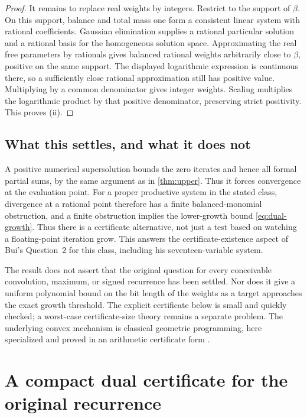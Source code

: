 \documentclass[11pt,a4paper]{article}
\theoremstyle{definition}
\theoremstyle{remark}
\begin{document}
\begin{proof}
It remains to replace real weights by integers. Restrict to the support of
$\beta$. On this support, balance and total mass one form a consistent
linear system with rational coefficients. Gaussian elimination supplies a
rational particular solution and a rational basis for the homogeneous
solution space. Approximating the real free parameters by rationals gives
balanced rational weights arbitrarily close to $\beta$, positive on the
same support. The displayed logarithmic expression is continuous there,
so a sufficiently close rational approximation still has positive value.
Multiplying by a common denominator gives integer weights. Scaling multiplies
the logarithmic product by that positive denominator, preserving strict
positivity. This proves (ii).
\end{proof}

\subsection{What this settles, and what it does not}
A positive numerical supersolution bounds the zero iterates and hence all
formal partial sums, by the same argument as in \cref{thm:upper}. Thus it
forces convergence at the evaluation point. For a proper productive system
in the stated class, divergence at a rational point therefore has a finite
balanced-monomial obstruction, and a finite obstruction
implies the lower-growth bound \eqref{eq:dual-growth}. Thus there is a
certificate alternative, not just a test based on watching a floating-point
iteration grow. This answers the certificate-existence aspect of Bui's
Question~2 for this class, including his seventeen-variable system.

The result does not assert that the original question for every conceivable
convolution, maximum, or signed recurrence has been settled. Nor does it give
a uniform polynomial bound on the bit length of the weights as a target
approaches the exact growth threshold. The explicit certificate below is
small and quickly checked; a worst-case certificate-size theory remains a
separate problem. The underlying convex mechanism is classical geometric
programming, here specialized and proved in an arithmetic certificate form
\cite{duffin,boyd,bv}.

\section{A compact dual certificate for the original recurrence}
\label{sec:dual-example}
\end{document}

